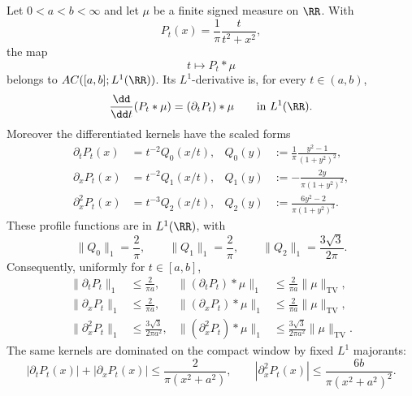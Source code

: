 \begin{lemma}%
\label{lem:poisson-kernel-l1-ac-bounds}
Let \(0<a<b<\infty\) and let \(\mu\) be a finite signed measure on
\(\RR\).  With
\[
P_t(x)=\frac1\pi\frac{t}{t^2+x^2},
\]
the map
\[
t\longmapsto P_t*\mu
\]
belongs to \(AC([a,b];L^1(\RR))\).  Its \(L^1\)-derivative is, for every
\(t\in(a,b)\),
\begin{equation}\label{eq:poisson-convolution-time-derivative-l1}
\frac{\dd}{\dd t}(P_t*\mu)=(\partial_tP_t)*\mu
\qquad\text{in }L^1(\RR).
\end{equation}
Moreover the differentiated kernels have the scaled forms
\begin{align}
\partial_tP_t(x)&=t^{-2}Q_0(x/t),
&Q_0(y)&:=\frac1\pi\frac{y^2-1}{(1+y^2)^2}, \label{eq:poisson-Qt-scaled}\\
\partial_xP_t(x)&=t^{-2}Q_1(x/t),
&Q_1(y)&:=-\frac{2y}{\pi(1+y^2)^2}, \label{eq:poisson-Qx-scaled}\\
\partial_x^2P_t(x)&=t^{-3}Q_2(x/t),
&Q_2(y)&:=\frac{6y^2-2}{\pi(1+y^2)^3}. \label{eq:poisson-Qxx-scaled}
\end{align}
These profile functions are in \(L^1(\RR)\), with
\begin{equation}\label{eq:poisson-Q-profile-l1-norms}
\|Q_0\|_1=\frac2\pi,\qquad
\|Q_1\|_1=\frac2\pi,\qquad
\|Q_2\|_1=\frac{3\sqrt3}{2\pi}.
\end{equation}
Consequently, uniformly for \(t\in[a,b]\),
\begin{align}
\|\partial_tP_t\|_1&\le \frac{2}{\pi a},
&
\|(\partial_tP_t)*\mu\|_1&\le \frac{2}{\pi a}\|\mu\|_{\mathrm{TV}},
\label{eq:poisson-dt-uniform-l1-bound}\\
\|\partial_xP_t\|_1&\le \frac{2}{\pi a},
&
\|(\partial_xP_t)*\mu\|_1&\le \frac{2}{\pi a}\|\mu\|_{\mathrm{TV}},
\label{eq:poisson-dx-uniform-l1-bound}\\
\|\partial_x^2P_t\|_1&\le \frac{3\sqrt3}{2\pi a^2},
&
\|(\partial_x^2P_t)*\mu\|_1&\le
\frac{3\sqrt3}{2\pi a^2}\|\mu\|_{\mathrm{TV}}.
\label{eq:poisson-dxx-uniform-l1-bound}
\end{align}
The same kernels are dominated on the compact window by fixed \(L^1\)
majorants:
\begin{equation}\label{eq:poisson-derivative-pointwise-majorants}
|\partial_tP_t(x)|+|\partial_xP_t(x)|
\le \frac{2}{\pi(x^2+a^2)},\qquad
|\partial_x^2P_t(x)|
\le \frac{6b}{\pi(x^2+a^2)^2}.
\end{equation}
\end{lemma}

